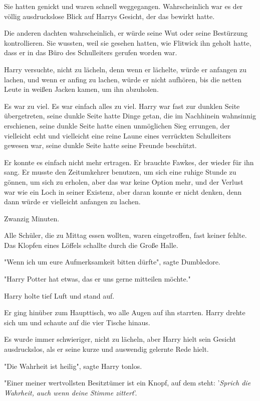 {Sie hatten genickt und waren schnell weggegangen. Wahrscheinlich war es der völlig ausdruckslose Blick auf Harrys Gesicht, der das bewirkt hatte.

Die anderen dachten wahrscheinlich, er würde seine Wut oder seine Bestürzung kontrollieren. Sie wussten, weil sie gesehen hatten, wie Flitwick ihn geholt hatte, dass er in das Büro des Schulleiters gerufen worden war.

Harry versuchte, nicht zu lächeln, denn wenn er lächelte, würde er anfangen zu lachen, und wenn er anfing zu lachen, würde er nicht aufhören, bis die netten Leute in weißen Jacken kamen, um ihn abzuholen.

Es war zu viel. Es war einfach alles zu viel. Harry war fast zur dunklen Seite übergetreten, seine dunkle Seite hatte Dinge getan, die im Nachhinein wahnsinnig erschienen, seine dunkle Seite hatte einen unmöglichen Sieg errungen, der vielleicht echt und vielleicht eine reine Laune eines verrückten Schulleiters gewesen war, seine dunkle Seite hatte seine Freunde beschützt.

Er konnte es einfach nicht mehr ertragen. Er brauchte Fawkes, der wieder für ihn sang. Er musste den Zeitumkehrer benutzen, um sich eine ruhige Stunde zu gönnen, um sich zu erholen, aber das war keine Option mehr, und der Verlust war wie ein Loch in seiner Existenz, aber daran konnte er nicht denken, denn dann würde er vielleicht anfangen zu lachen.

Zwanzig Minuten.

Alle Schüler, die zu Mittag essen wollten, waren eingetroffen, fast keiner fehlte. Das Klopfen eines Löffels schallte durch die Große Halle.

"Wenn ich um eure Aufmerksamkeit bitten dürfte", sagte Dumbledore.

"Harry Potter hat etwas, das er uns gerne mitteilen möchte."

Harry holte tief Luft und stand auf.

Er ging hinüber zum Haupttisch, wo alle Augen auf ihn starrten. Harry drehte sich um und schaute auf die vier Tische hinaus.

Es wurde immer schwieriger, nicht zu lächeln, aber Harry hielt sein Gesicht ausdruckslos, als er seine kurze und auswendig gelernte Rede hielt.

"Die Wahrheit ist heilig", sagte Harry tonlos.

"Einer meiner wertvollsten Besitztümer ist ein Knopf, auf dem steht: '\emph{Sprich die Wahrheit, auch wenn deine Stimme zittert}'.

}
